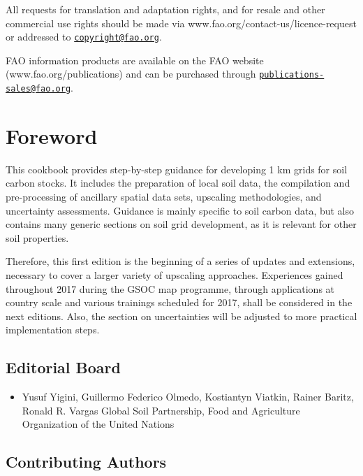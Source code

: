 \documentclass[10pt,b5paper,]{book}
\providecommand{\tightlist}{%
  \setlength{\itemsep}{0pt}\setlength{\parskip}{0pt}}
\theoremstyle{definition}
\theoremstyle{definition}
\theoremstyle{definition}
\theoremstyle{remark}
\begin{document}
All requests for translation and adaptation rights, and for resale and
other commercial use rights should be made via
www.fao.org/contact-us/licence-request or addressed to
\href{mailto:copyright@fao.org}{\nolinkurl{copyright@fao.org}}.

FAO information products are available on the FAO website
(www.fao.org/publications) and can be purchased through
\href{mailto:publications-sales@fao.org}{\nolinkurl{publications-sales@fao.org}}.

\hypertarget{foreword}{%
\chapter*{Foreword}\label{foreword}}

This cookbook provides step-by-step guidance for developing 1 km grids
for soil carbon stocks. It includes the preparation of local soil data,
the compilation and pre-processing of ancillary spatial data sets,
upscaling methodologies, and uncertainty assessments. Guidance is mainly
specific to soil carbon data, but also contains many generic sections on
soil grid development, as it is relevant for other soil properties.

Therefore, this first edition is the beginning of a series of updates
and extensions, necessary to cover a larger variety of upscaling
approaches. Experiences gained throughout 2017 during the GSOC map
programme, through applications at country scale and various trainings
scheduled for 2017, shall be considered in the next editions. Also, the
section on uncertainties will be adjusted to more practical
implementation steps.

\clearpage

\hypertarget{editorial-board}{%
\section*{Editorial Board}\label{editorial-board}}

\begin{itemize}
\tightlist
\item
  Yusuf Yigini, Guillermo Federico Olmedo, Kostiantyn Viatkin, Rainer
  Baritz, Ronald R. Vargas Global Soil Partnership, Food and Agriculture
  Organization of the United Nations
\end{itemize}

\hypertarget{contributing-authors}{%
\section*{Contributing Authors}\label{contributing-authors}}
\end{document}
